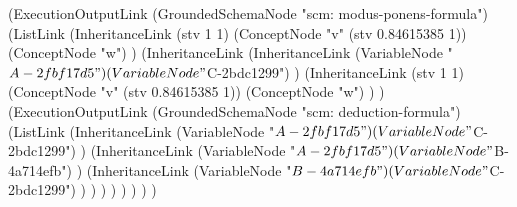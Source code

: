 \documentclass{beamer}
\makeatletter
\newcommand{\reallytiny}{\@setfontsize{\srcsize}{2pt}{2pt}}
\makeatother
\begin{document}
\begin{frame}[fragile]
\begin{columns}
{\reallytiny
\begin{semiverbatim}
         (ExecutionOutputLink
            (GroundedSchemaNode "scm: modus-ponens-formula")
            (ListLink
               (InheritanceLink (stv 1 1)
                  (ConceptNode "v" (stv 0.84615385 1))
                  (ConceptNode "w")
               )
               (InheritanceLink
                  (InheritanceLink
                     (VariableNode "$A-2fbf17d5")
                     (VariableNode "$C-2bdc1299")
                  )
                  (InheritanceLink (stv 1 1)
                     (ConceptNode "v" (stv 0.84615385 1))
                     (ConceptNode "w")
                  )
               )
               (ExecutionOutputLink
                  (GroundedSchemaNode "scm: deduction-formula")
                  (ListLink
                     (InheritanceLink
                        (VariableNode "$A-2fbf17d5")
                        (VariableNode "$C-2bdc1299")
                     )
                     (InheritanceLink
                        (VariableNode "$A-2fbf17d5")
                        (VariableNode "$B-4a714efb")
                     )
                     (InheritanceLink
                        (VariableNode "$B-4a714efb")
                        (VariableNode "$C-2bdc1299")
                     )
                  )
               )
            )
         )
      )
   )
)
\end{semiverbatim}
}

\end{columns}

\end{frame}
\end{document}
